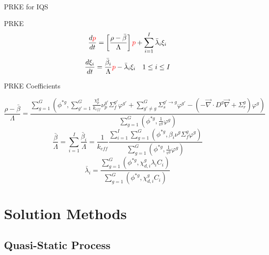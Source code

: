 \documentclass[8pt,xcolor=dvipnames]{beamer}
\renewcommand{\div}{\vec{\nabla}\! \cdot \!}
\newcommand{\grad}{\vec{\nabla}}
\newcommand{\be}{\begin{equation*}}
\newcommand{\ee}{\end{equation*}}
\newcommand{\keff}{\ensuremath{k_{\textit{eff}}}}
\newcommand{\tcr}[1]{\textcolor{red}{#1}}
\begin{document}
\begin{frame}{PRKE for IQS}
\vspace{-2mm}
\begin{block}{PRKE}
\[
\frac{d\tcr{p}}{dt}=\left[\frac{\rho-\bar{\beta}}{\Lambda}\right]\tcr{p}+\sum_{i=1}^I\bar{\lambda}_i\xi_i
\]
\[
\frac{d\xi_i}{dt}=\frac{\bar{\beta}_i}{\Lambda}\tcr{p} - \bar{\lambda}_i\xi_i \quad 1 \le i \le I 
\]
\end{block}
\begin{block}{PRKE Coefficients}

\small \be
\frac{\rho-\bar{\beta}}{\Lambda}=
\frac{ \sum_{g=1}^G \left(\phi^{*g},\sum_{g'=1}^G\frac{\chi_p^g}{\keff} \nu_p^{g'} \Sigma_f^{g'}\varphi^{g'} + \sum_{g'\neq g}^G\Sigma_s^{g'\to g} \varphi^{g'} -\left( -\div D^g \grad  + \Sigma_r^g \right)\varphi^g\right)}
{\sum_{g=1}^G \left(\phi^{*g},\frac{1}{v^g}\varphi^g\right)}
\ee \normalsize
\be
\frac{\bar{\beta}}{\Lambda}=\sum_{i=1}^I\frac{\bar{\beta}_i}{\Lambda}=\frac{1}{\keff}
\frac{\sum_{i=1}^I\sum_{g=1}^G(\phi^{*g}, \beta_i\nu^{g} \Sigma_f^g \varphi^{g})}
{\sum_{g=1}^G \left(\phi^{*g},\frac{1}{v^g}\varphi^g\right)}
\ee
\be
\bar{\lambda}_i=\frac{\sum_{g=1}^G(\phi^{*g},\chi_{d,i}^g\lambda_i C_i)}{\sum_{g=1}^G(\phi^{*g},\chi_{d,i}^gC_i)}
\ee

\end{block}

\end{frame}


\section{Solution Methods}

\subsection{Quasi-Static Process}
\end{document}

